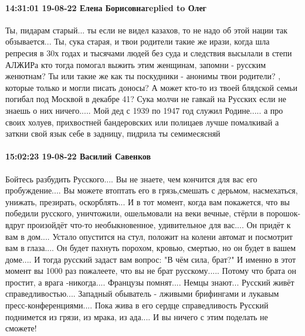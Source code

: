  
 
 
 
 

\paragraph{14:31:01 19-08-22 Елена Борисовнаreplied to Олег}

Ты, пидарам старый... ты если не видел казахов, то не надо об этой нации так обзывается... Ты, сука старая, и твои родители такие же ирази, когда шла репресия в 30х годах и тысячами людей без суда и следствия высылали в степи АЛЖИРа кто тогда помогал выжить этим женщинам, запомни - русским женютнам? Ты или такие же как ты поскудники - анонимы твои родители? , которые только и могли писать доносы? А может кто-то из твоей блядской семьи погибал под Москвой в декабре 41?
Сука молчи не гавкай на Русских если не знаешь о них ничего.....
Мой дед с 1939 по 1947 год служил Родине..... а про своих холуев, прихвостней бандеровских или полицаев лучше помалкивай а заткни свой язык себе в задницу, пидрила ты семимесясняй

\paragraph{15:02:23 19-08-22 Василий Савенков}
Бойтесь разбудить Русского....
Вы не знаете, чем кончится для вас его пробуждение.... Вы можете втоптать его в
грязь,смешать с дерьмом, насмехаться, унижать, презирать, оскорблять... И в тот момент, когда вам покажется, что вы победили русского, уничтожили, ошельмовали на веки вечные, стёрли в порошок- вдруг произойдёт что-то необыкновенное, удивительное для вас.... Он придёт к вам в дом.... Устало опустится на стул, положит на колени автомат и посмотрит вам в глаза.... Он будет пахнуть порохом, кровью, смертью, но он будет в вашем доме.... И тогда русский задаст вам вопрос: "В чём сила, брат?" И именно в этот момент вы 1000 раз пожалеете, что вы не брат русскому..... Потому что брата он простит, а врага -никогда.... Французы помнят.... Немцы знают... Русский живёт справедливостью....
Западный обыватель - лживыми брифингами и лукавым пресс-конференциями....
Пока жива в его сердце справедливость Русский поднимется из грязи, из мрака, из ада.... И вы ничего с этим поделать не сможете!

